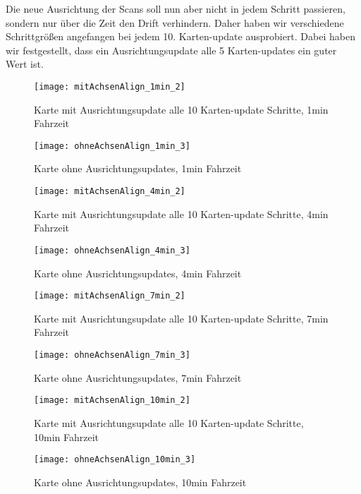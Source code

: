 Die neue Ausrichtung der Scans soll nun aber nicht in jedem Schritt passieren, sondern nur über die Zeit den Drift verhindern. Daher haben wir verschiedene Schrittgrößen angefangen bei jedem 10. Karten-update ausprobiert. Dabei haben wir festgestellt, dass ein Ausrichtungsupdate alle 5 Karten-updates ein guter Wert ist.

\begin{figure}
	\centering
	\texttt{[image: mitAchsenAlign\_1min\_2]}
	\caption{Karte mit Ausrichtungsupdate alle 10 Karten-update Schritte, 1min Fahrzeit\newline}
	\label{fig:mitAchsenAlign_1min}
	\texttt{[image: ohneAchsenAlign\_1min\_3]}
	\caption{Karte ohne Ausrichtungsupdates, 1min Fahrzeit\newline}
	\label{fig:ohneAchsenAlign_1min}
\end{figure}

\begin{figure}
	\centering
	\texttt{[image: mitAchsenAlign\_4min\_2]}
	\caption{Karte mit Ausrichtungsupdate alle 10 Karten-update Schritte, 4min Fahrzeit\newline}
	\label{fig:mitAchsenAlign_4min}
	\texttt{[image: ohneAchsenAlign\_4min\_3]}
	\caption{Karte ohne Ausrichtungsupdates, 4min Fahrzeit\newline}
	\label{fig:ohneAchsenAlign_4min}
\end{figure}

\begin{figure}
	\centering
	\texttt{[image: mitAchsenAlign\_7min\_2]}
	\caption{Karte mit Ausrichtungsupdate alle 10 Karten-update Schritte, 7min Fahrzeit\newline}
	\label{fig:mitAchsenAlign_7min}
	\texttt{[image: ohneAchsenAlign\_7min\_3]}
	\caption{Karte ohne Ausrichtungsupdates, 7min Fahrzeit\newline}
	\label{fig:ohneAchsenAlign_7min}
\end{figure}

\begin{figure}
	\centering
	\texttt{[image: mitAchsenAlign\_10min\_2]}
	\caption{Karte mit Ausrichtungsupdate alle 10 Karten-update Schritte, 10min Fahrzeit\newline}
	\label{fig:mitAchsenAlign_10min}
	\texttt{[image: ohneAchsenAlign\_10min\_3]}
	\caption{Karte ohne Ausrichtungsupdates, 10min Fahrzeit\newline}
	\label{fig:ohneAchsenAlign_10min}
\end{figure}